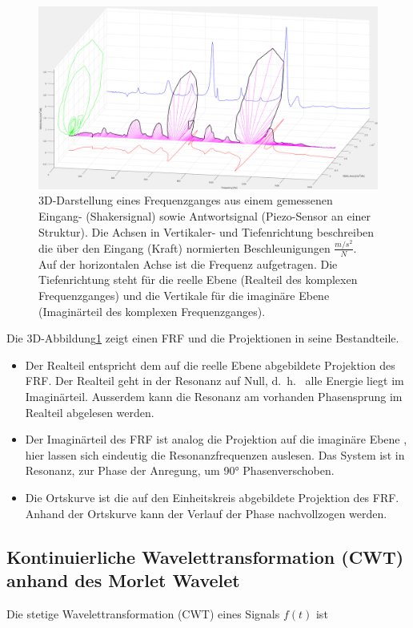 \begin{figure}
	\centering
	\includegraphics[width=\textwidth]{papers/wavelets/images/4_FRF_iso.png}
	\caption{3D-Darstellung eines Frequenzganges aus einem gemessenen Eingang- (Shakersignal) sowie Antwortsignal (Piezo-Sensor an einer Struktur). Die Achsen in Vertikaler- und Tiefenrichtung beschreiben die über den Eingang (Kraft) normierten Beschleunigungen $\frac{m/s^2}{N}$. Auf der horizontalen Achse ist die Frequenz aufgetragen. Die Tiefenrichtung steht für die reelle Ebene (Realteil des komplexen Frequenzganges) und die Vertikale für die imaginäre Ebene (Imaginärteil des komplexen Frequenzganges).}
	\label{wavelet:fig:FRF_iso}
\end{figure}

Die 3D-Abbildung\ref{wavelet:fig:FRF_iso} zeigt einen FRF und die Projektionen in seine Bestandteile.

\begin{itemize}
	\item Der Realteil entspricht dem auf die reelle Ebene abgebildete Projektion des FRF. Der Realteil geht in der Resonanz auf Null, d.~h.~ alle Energie liegt im Imaginärteil. Ausserdem kann die Resonanz am vorhanden Phasensprung im Realteil abgelesen werden.
	\item Der Imaginärteil des FRF ist analog die Projektion auf die imaginäre Ebene , hier lassen sich eindeutig die Resonanzfrequenzen auslesen. Das System ist in Resonanz, zur Phase der Anregung, um 90° Phasenverschoben.
	\item Die Ortskurve ist die auf den Einheitskreis abgebildete Projektion des FRF. Anhand der Ortskurve kann der Verlauf der Phase nachvollzogen werden.
\end{itemize}

\subsection{Kontinuierliche Wavelettransformation (CWT) anhand des Morlet Wavelet
	\label{wavelets:subsection:CWT}}
Die stetige Wavelettransformation (CWT) eines Signals $f(t)$ ist \cite{wavelets:H.Burkhardt.2020}

